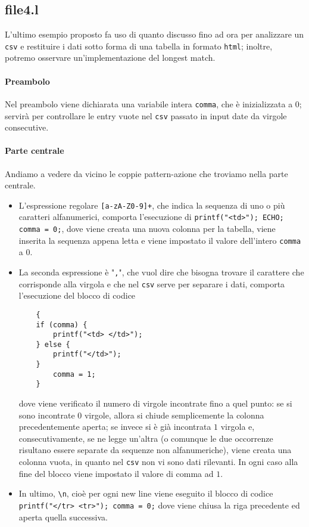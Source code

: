 \documentclass[class=book, crop=false, oneside, 12pt]{standalone}
\begin{document}
\subsection*{file4.l} 
\noindent L'ultimo esempio proposto fa uso di quanto discusso fino ad ora per analizzare un \texttt{csv} e restituire i dati sotto forma di una tabella in formato \texttt{html}; inoltre, potremo osservare un'implementazione del longest match.

\paragraph{Preambolo}
Nel preambolo viene dichiarata una variabile intera \texttt{comma}, che è inizializzata a \(0\); servirà per controllare le entry vuote nel \texttt{csv} passato in input date da virgole consecutive.

\paragraph{Parte centrale}
Andiamo a vedere da vicino le coppie pattern-azione che troviamo nella parte centrale.
\begin{itemize}
    \item L'espressione regolare \texttt{[a-zA-Z0-9]+}, che indica la sequenza di uno o più caratteri alfanumerici, comporta l'esecuzione di \texttt{printf("<td>"); ECHO; comma = 0;}, dove viene creata una nuova colonna per la tabella, viene inserita la sequenza appena letta e viene impostato il valore dell'intero \texttt{comma} a \(0\).
    \item La seconda espressione è "\texttt{,}", che vuol dire che bisogna trovare il carattere che corrisponde alla virgola e che nel \texttt{csv} serve per separare i dati, comporta l'esecuzione del blocco di codice
    \begin{verbatim}
    {            
    if (comma) {
        printf("<td> </td>"); 
    } else { 
        printf("</td>");
    }       
        comma = 1;
    }
    \end{verbatim}
        
    dove viene verificato il numero di virgole incontrate fino a quel punto: se si sono incontrate 0 virgole, allora si chiude semplicemente la colonna precedentemente aperta; se invece si è già incontrata \(1\) virgola e, consecutivamente, se ne legge un'altra (o comunque le due occorrenze risultano essere separate da sequenze non alfanumeriche), viene creata una colonna vuota, in quanto nel \texttt{csv} non vi sono dati rilevanti. In ogni caso alla fine del blocco viene impostato il valore di comma ad \(1\).
    \item In ultimo, \texttt{\textbackslash n}, cioè per ogni new line viene eseguito il blocco di codice \texttt{{printf("</tr> \n <tr>"); comma = 0;}} dove viene chiusa la riga precedente ed aperta quella successiva.
\end{itemize}
\end{document}
